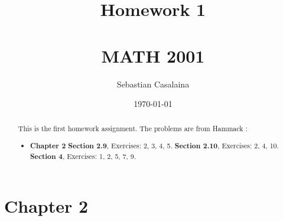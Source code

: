 \documentclass[12pt]{amsart}
\numberwithin{equation}{section}
\theoremstyle{definition}
\theoremstyle{remark}
\begin{document}




\author[Casalaina]{Sebastian Casalaina}
\address{University of Colorado, Department of Mathematics,  Campus Box 395,
Boulder, CO 80309-0395}
\date{\today}



\title[Homework 1]{Homework 1 \\ \ \\  MATH 2001}

\begin{abstract} 
This is the first homework assignment.  The problems are from Hammack \cite[Ch.~1, \S 1.1]{H13}:
\begin{itemize}

\item \textbf{Chapter 2}  
\textbf{Section 2.9}, Exercises:  2, 3, 4, 5.
\textbf{Section 2.10}, Exercises:  2, 4, 10.
\textbf{Section 4}, Exercises:  1, 2, 5, 7, 9.

\end{itemize}
\end{abstract}


\maketitle


\tableofcontents





\section*{Chapter 2}


\end{document}
